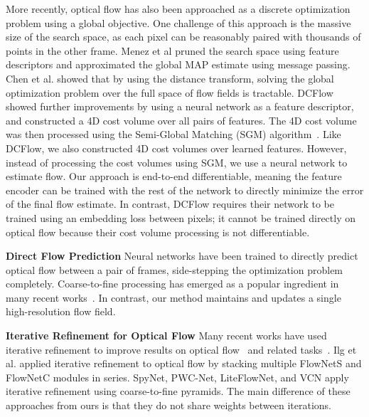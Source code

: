 \documentclass[runningheads]{llncs}
\begin{document}
More recently, optical flow has also been approached as a discrete optimization problem \cite{discreteflow,fullflow,dcflow} using a global objective. One challenge of this approach is the massive size of the search space, as each pixel can be reasonably paired with thousands of points in the other frame. Menez et al\cite{discreteflow} pruned the search space using feature descriptors and approximated the global MAP estimate using message passing. Chen et al. \cite{fullflow} showed that by using the distance transform, solving the global optimization problem over the full space of flow fields is tractable.  DCFlow \cite{dcflow} showed further improvements by using a neural network as a feature descriptor, and constructed a 4D cost volume over all pairs of features. The 4D cost volume was then processed using the Semi-Global Matching (SGM) algorithm~\cite{sgm}. Like DCFlow, we also constructed 4D cost volumes over learned features. However, instead of processing the cost volumes using SGM, we use a neural network to estimate flow. Our approach is end-to-end differentiable, meaning the feature encoder can be trained with the rest of the network to directly minimize the error of the final flow estimate. In contrast, DCFlow requires their network to be trained using an embedding loss between pixels; it cannot be trained directly on optical flow because their cost volume processing is not differentiable. 

\smallskip\noindent \textbf{Direct Flow Prediction} Neural networks have been trained to directly predict optical flow between a pair of frames, side-stepping the optimization problem completely. Coarse-to-fine processing has emerged as a popular ingredient in many recent works~\cite{pwcnet,hd3,liteflownet,liteflownet2,irr,vcn,flowelements,scopeflow,maskflownet}. In contrast, our method maintains and updates a single high-resolution flow field.

\smallskip\noindent\textbf{Iterative Refinement for Optical Flow}
Many recent works have used iterative refinement to improve results on optical flow~\cite{ilg2017flownet,spynet,pwcnet,liteflownet,vcn} and related tasks~\cite{iresnet,deeptam,deepv2d,li2018recurrent}. Ilg et al. \cite{ilg2017flownet} applied iterative refinement to optical flow by stacking multiple FlowNetS and FlowNetC modules in series. SpyNet\cite{spynet}, PWC-Net\cite{pwcnet}, LiteFlowNet\cite{liteflownet}, and VCN \cite{vcn} apply iterative refinement using coarse-to-fine pyramids. The main difference of these approaches from ours is that they do not share weights between iterations. 
\end{document}

